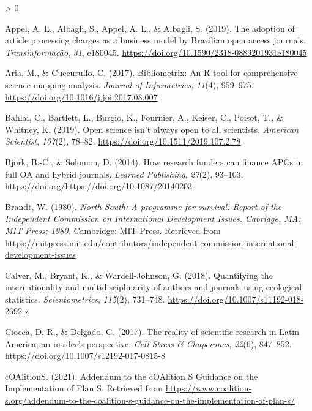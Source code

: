 \documentclass[
  english,
  man]{apa6}
\newlength{\cslhangindent}
\newenvironment{CSLReferences}[2] %
 {%
  \setlength{\parindent}{0pt}
  \ifodd #1 \everypar{\setlength{\hangindent}{\cslhangindent}}\ignorespaces\fi
  \ifnum #2 > 0
  \setlength{\parskip}{#2\baselineskip}
  \fi
 }%
 {}
\begin{document}
\hypertarget{refs}{}
\begin{CSLReferences}{1}{0}
\leavevmode\hypertarget{ref-appel_adoption_2019}{}%
Appel, A. L., Albagli, S., Appel, A. L., \& Albagli, S. (2019). The adoption of article processing charges as a business model by {Brazilian} open access journals. \emph{Transinformação}, \emph{31}, e180045. \url{https://doi.org/10.1590/2318-0889201931e180045}

\leavevmode\hypertarget{ref-aria_bibliometrix_2017}{}%
Aria, M., \& Cuccurullo, C. (2017). Bibliometrix: {An} {R}-tool for comprehensive science mapping analysis. \emph{Journal of Informetrics}, \emph{11}(4), 959--975. \url{https://doi.org/10.1016/j.joi.2017.08.007}

\leavevmode\hypertarget{ref-bahlai_open_2019}{}%
Bahlai, C., Bartlett, L., Burgio, K., Fournier, A., Keiser, C., Poisot, T., \& Whitney, K. (2019). Open science isn't always open to all scientists. \emph{American Scientist}, \emph{107}(2), 78--82. \url{https://doi.org/10.1511/2019.107.2.78}

\leavevmode\hypertarget{ref-bjork_how_2014}{}%
Björk, B.-C., \& Solomon, D. (2014). How research funders can finance {APCs} in full {OA} and hybrid journals. \emph{Learned Publishing}, \emph{27}(2), 93--103. https://doi.org/\url{https://doi.org/10.1087/20140203}

\leavevmode\hypertarget{ref-brandt_north-south_1980}{}%
Brandt, W. (1980). \emph{North-{South}: A programme for survival: Report of the {Independent} {Commission} on {International} {Development} {Issues}. {Cabridge}, {MA}: {MIT} {Press}; 1980.} Cambridge: MIT Press. Retrieved from \url{https://mitpress.mit.edu/contributors/independent-commission-international-development-issues}

\leavevmode\hypertarget{ref-calver_quantifying_2018}{}%
Calver, M., Bryant, K., \& Wardell-Johnson, G. (2018). Quantifying the internationality and multidisciplinarity of authors and journals using ecological statistics. \emph{Scientometrics}, \emph{115}(2), 731--748. \url{https://doi.org/10.1007/s11192-018-2692-z}

\leavevmode\hypertarget{ref-ciocca_reality_2017}{}%
Ciocca, D. R., \& Delgado, G. (2017). The reality of scientific research in {Latin} {America}; an insider's perspective. \emph{Cell Stress \& Chaperones}, \emph{22}(6), 847--852. \url{https://doi.org/10.1007/s12192-017-0815-8}

\leavevmode\hypertarget{ref-coalitions_addendum_2021}{}%
cOAlitionS. (2021). Addendum to the {cOAlition} {S} {Guidance} on the {Implementation} of {Plan} {S}. Retrieved from \url{https://www.coalition-s.org/addendum-to-the-coalition-s-guidance-on-the-implementation-of-plan-s/}


\end{CSLReferences}
\end{document}
